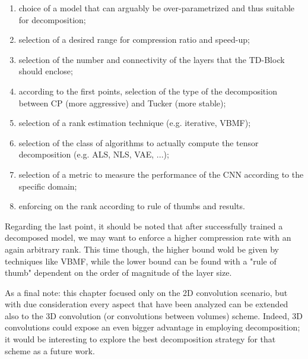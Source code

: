 \begin{enumerate}
    \item choice of a model that can arguably be over-parametrized and thus suitable for decomposition; 
    
    \item selection of a desired range for compression ratio and speed-up;
    
    \item selection of the number and connectivity of the layers that the TD-Block should enclose;
    
    \item according to the first points, selection of the type of the decomposition between CP (more aggressive) and Tucker (more stable); 
    
    \item selection of a rank estimation technique (e.g. iterative, VBMF);
    
    \item selection of the class of algorithms to actually compute the tensor decomposition (e.g. ALS, NLS, VAE, ...);
    
    \item selection of a metric to measure the performance of the CNN according to the specific domain;
    
    \item enforcing on the rank according to rule of thumbs and results. 
    
\end{enumerate}

Regarding the last point, it should be noted that after successfully trained a decomposed model, we may want to enforce a higher compression rate with an again arbitrary rank. This time though, the higher bound wold be given by  techniques like VBMF, while the lower bound can be found with a "rule of thumb" dependent on the order of magnitude of the layer size.

As a final note: this chapter focused only on the 2D convolution scenario, but with due consideration every aspect that have been analyzed can be extended also to the 3D convolution (or convolutions between volumes) scheme. Indeed, 3D convolutions could expose an even bigger advantage in employing decomposition; it would be interesting to explore the best decomposition strategy for that scheme as a future work.


